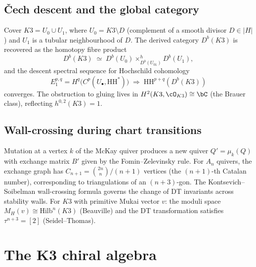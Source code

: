 \subsection{\v{C}ech descent and the global category}
\label{subsec:cech-descent}

\begin{theorem}
\label{thm:cech-descent}
Cover $K3 = U_0 \cup U_1$, where $U_0 = K3 \setminus D$
(complement of a smooth divisor $D \in |H|$) and $U_1$ is a
tubular neighbourhood of $D$. The derived category $D^b(K3)$
is recovered as the homotopy fibre product
\[
D^b(K3) \;\simeq\; D^b(U_0) \times^h_{D^b(U_{01})} D^b(U_1),
\]
and the descent spectral sequence for Hochschild cohomology
\[
E_1^{p,q} = H^q\bigl(C^p(U_\bullet, \mathrm{HH}^*)\bigr)
\;\Longrightarrow\; \mathrm{HH}^{p+q}(D^b(K3))
\]
converges. The obstruction to gluing lives in
$H^2(K3, \cO_{K3}) \cong \bC$ (the Brauer class), reflecting
$h^{0,2}(K3) = 1$.
\end{theorem}

\subsection{Wall-crossing during chart transitions}
\label{subsec:wallcrossing-charts}

\begin{remark}
\label{rem:cluster-bridgeland}
Mutation at a vertex $k$ of the McKay quiver produces a new
quiver $Q' = \mu_k(Q)$ with exchange matrix $B'$ given by the
Fomin--Zelevinsky rule. For $A_n$ quivers, the exchange graph
has $C_{n+1} = \binom{2n}{n}/(n+1)$ vertices (the $(n+1)$-th
Catalan number), corresponding to triangulations of an
$(n+3)$-gon. The Kontsevich--Soibelman wall-crossing formula
governs the change of DT invariants across stability walls.
For $K3$ with primitive Mukai vector $v$: the moduli space
$M_H(v) \cong \mathrm{Hilb}^n(K3)$ (Beauville) and the
DT transformation satisfies $\tau^{n+3} = [2]$
(Seidel--Thomas).
\end{remark}



\section{The K3 chiral algebra}
\label{sec:k3-chiral-algebra}

